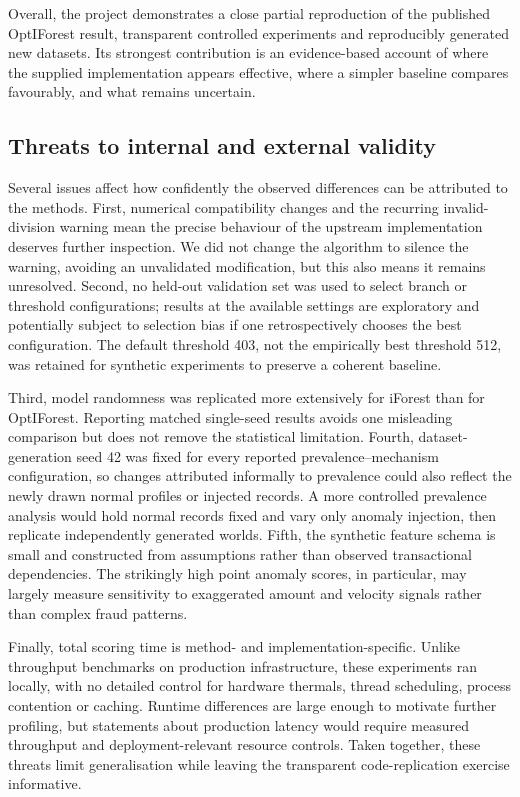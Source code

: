 \documentclass[11pt]{article}
\begin{document}
Overall, the project demonstrates a close partial reproduction of the published OptIForest result, transparent controlled experiments and reproducibly generated new datasets. Its strongest contribution is an evidence-based account of where the supplied implementation appears effective, where a simpler baseline compares favourably, and what remains uncertain.
 
 
\subsection{Threats to internal and external validity}
Several issues affect how confidently the observed differences can be attributed to the methods. First, numerical compatibility changes and the recurring invalid-division warning mean the precise behaviour of the upstream implementation deserves further inspection. We did not change the algorithm to silence the warning, avoiding an unvalidated modification, but this also means it remains unresolved. Second, no held-out validation set was used to select branch or threshold configurations; results at the available settings are exploratory and potentially subject to selection bias if one retrospectively chooses the best configuration. The default threshold 403, not the empirically best threshold 512, was retained for synthetic experiments to preserve a coherent baseline.
 
Third, model randomness was replicated more extensively for iForest than for OptIForest. Reporting matched single-seed results avoids one misleading comparison but does not remove the statistical limitation. Fourth, dataset-generation seed 42 was fixed for every reported prevalence--mechanism configuration, so changes attributed informally to prevalence could also reflect the newly drawn normal profiles or injected records. A more controlled prevalence analysis would hold normal records fixed and vary only anomaly injection, then replicate independently generated worlds. Fifth, the synthetic feature schema is small and constructed from assumptions rather than observed transactional dependencies. The strikingly high point anomaly scores, in particular, may largely measure sensitivity to exaggerated amount and velocity signals rather than complex fraud patterns.
 
Finally, total scoring time is method- and implementation-specific. Unlike throughput benchmarks on production infrastructure, these experiments ran locally, with no detailed control for hardware thermals, thread scheduling, process contention or caching. Runtime differences are large enough to motivate further profiling, but statements about production latency would require measured throughput and deployment-relevant resource controls. Taken together, these threats limit generalisation while leaving the transparent code-replication exercise informative.
 
\end{document}
